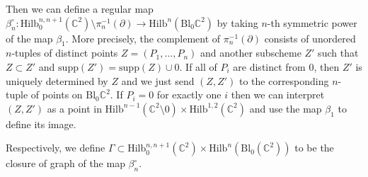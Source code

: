 \documentclass[12pt]{amsart}
\newcommand{\Hilb}{\mathrm{Hilb}}
\newcommand{\C}{\mathbb{C}}
\newcommand{\supp}{\mathrm{supp}}
\newcommand{\Bl}{\mathrm{Bl}}
\numberwithin{equation}{section}
\theoremstyle{definition}
\begin{document}
Then
we can define a regular map \(\beta_n^\circ: \Hilb_0^{n,n+1}(\C^2)\setminus \pi_n^{-1}(\partial)\to \Hilb^n(\Bl_0\C^2)\) by taking \(n\)-th symmetric power of
the map \(\beta_1\). More precisely, the complement of $\pi_n^{-1}(\partial)$ consists of unordered $n$-tuples of distinct points $Z=(P_1,\ldots,P_n)$ and another subscheme $Z'$ such that $Z\subset Z'$ and $\supp(Z')=\supp(Z)\cup 0$. If all of $P_i$ are distinct from $0$, then $Z'$ is uniquely determined by $Z$ and we just send $(Z,Z')$ to the corresponding $n$-tuple of points on $\Bl_0\C^2$. If $P_i=0$ for exactly one $i$ then  we can interpret $(Z,Z')$ as a point in $\Hilb^{n-1}(\C^2\setminus 0)\times \Hilb^{1,2}(\C^2)$ and use the map $\beta_1$ to define its image.  

Respectively, we define  \(\Gamma\subset \Hilb_0^{n,n+1}(\C^2)\times \Hilb^n(\Bl_0(\C^2))\) to be the closure of
graph of the map \(\beta_n^\circ\).
\end{document}
